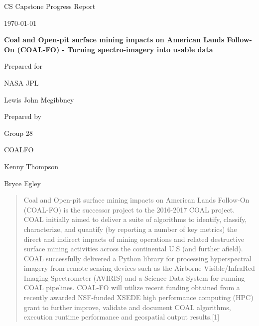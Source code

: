 \documentclass[onecolumn, draftclsnofoot,10pt, compsoc]{IEEEtran}
\def \CapstoneTeamName{		COALFO}
\def \CapstoneTeamNumber{		28}
\def \GroupMemberOne{			Kenny Thompson}
\def \GroupMemberTwo{			Bryce Egley}
\def \CapstoneProjectName{		Coal and Open-pit surface mining impacts on American Lands Follow-On (COAL-FO) - Turning spectro-imagery into usable data}
\def \CapstoneSponsorCompany{	NASA JPL}
\def \CapstoneSponsorPerson{		Lewis John Mcgibbney}
\def \DocType{	%
				Progress Report
				}
\newcommand{\NameSigPair}[1]{\par
\makebox[2.75in][r]{#1} \hfil 	\makebox[3.25in]{\makebox[2.25in]{\hrulefill} \hfill		\makebox[.75in]{\hrulefill}}
\par\vspace{-12pt} \textit{\tiny\noindent
\makebox[2.75in]{} \hfil		\makebox[3.25in]{\makebox[2.25in][r]{Signature} \hfill	\makebox[.75in][r]{Date}}}}
\renewcommand{\NameSigPair}[1]{#1}
\begin{document}
\begin{titlepage}
    \begin{singlespace}
        \hfill
        \par\vspace{.2in}
        \centering
        \scshape{
            \huge CS Capstone \DocType \par
            {\large\today}\par
            \vspace{.5in}
            \textbf{\Huge\CapstoneProjectName}\par
            \vfill
            {\large Prepared for}\par
            \Huge \CapstoneSponsorCompany\par
            \vspace{5pt}
            {\Large\NameSigPair{\CapstoneSponsorPerson}\par}
            {\large Prepared by }\par
            Group\CapstoneTeamNumber\par
            \CapstoneTeamName\par
            \vspace{5pt}
            {\Large
                \NameSigPair{\GroupMemberOne}\par
                \NameSigPair{\GroupMemberTwo}\par
            }
            \vspace{20pt}
        }
        \begin{abstract}
        	Coal and Open-pit surface mining impacts on American Lands Follow-On (COAL-FO) is the successor 				project to the 2016-2017 COAL project. COAL initially aimed to deliver a suite of algorithms to identify, classify, characterize, and quantify (by reporting a number of key metrics) the direct and indirect impacts of mining operations and related destructive surface mining activities across the continental U.S (and further afield). COAL successfully delivered a Python library for processing hyperspectral imagery from remote sensing devices such as the Airborne Visible/InfraRed Imaging Spectrometer (AVIRIS) and a Science Data System for running COAL pipelines. COAL-FO will utilize recent funding obtained from a recently awarded NSF-funded XSEDE high performance computing (HPC) grant to further improve, validate and document COAL algorithms, execution runtime performance and geospatial output results.[1]
        \end{abstract}
    \end{singlespace}
\end{titlepage}
\newpage
{}
\tableofcontents
\clearpage
\end{document}
